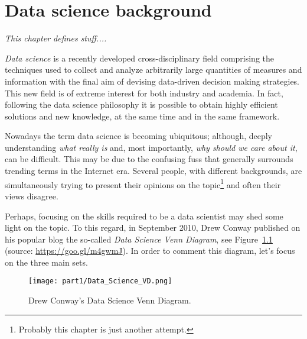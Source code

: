 
\chapter{Data science background} \label{chap:background}

\begin{displayquote}
	\textit{This chapter defines stuff....}
\end{displayquote}

\textit{Data science} is a recently developed cross-disciplinary field comprising the techniques used to collect and analyze arbitrarily large quantities of measures and information with the final aim of devising data-driven decision making strategies.
This new field is of extreme interest for both industry and academia. In fact, following the data science philosophy it is possible to obtain highly efficient solutions and new knowledge, at the same time and in the same framework.

Nowadays the term data science is becoming ubiquitous; although, deeply understanding \textit{what really is} and, most importantly, \textit{why should we care about it}, can be difficult.
This may be due to the confusing fuss that generally surrounds trending terms in the Internet era. Several people, with different backgrounds, are simultaneously trying to present their opinions on the topic\footnote{ Probably this chapter is just another attempt.} and often their views disagree.

Perhaps, focusing on the skills required to be a data scientist may shed some light on the topic. To this regard, in September 2010, Drew Conway published on his popular blog the so-called \textit{Data Science Venn Diagram}, see Figure~\ref{fig:data_science_venn_diagram}  (source: \url{https://goo.gl/m4gwmJ}).
In order to comment this diagram, let's focus on the three main sets.

\begin{figure}[h!]
	\centering
	\texttt{[image: part1/Data\_Science\_VD.png]}
	\caption{Drew Conway's Data Science Venn Diagram.} \label{fig:data_science_venn_diagram}
\end{figure}

